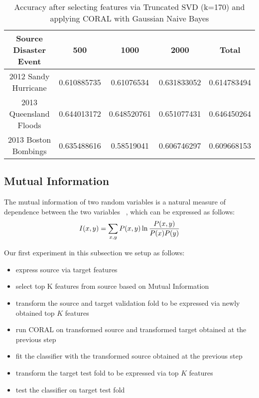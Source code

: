 \begin{table}[ht]
    \begin{center}
    \caption{Accuracy after selecting features via Truncated SVD (k=170) and applying CORAL with Gaussian Naive Bayes}
    \begin{tabular}[c]{|c|c|c|c|c|}
        \hline
        Source Disaster Event & 500 & 1000 & 2000 & Total \\
        \hline
        2012 Sandy Hurricane & 0.610885735 & 0.61076534 & 0.631833052 & 0.614783494 \\
        2013 Queensland Floods & 0.644013172 & 0.648520761 & 0.651077431 & 0.646450264 \\
        2013 Boston Bombings & 0.635488616 & 0.58519041 & 0.606746297 & 0.609668153 \\
        \hline
    \end{tabular}
    \label{tabletrunsvd170}
   \end{center}
\end{table}


\subsection{Mutual Information}

The mutual information of two random variables is a natural measure of dependence between the two variables ~\citep{hastie}, which can be expressed as follows: \[I(x,y) = \sum_{x,y} P(x,y) \ln {{P(x,y)}\over{P(x) P(y)}} \]

Our first experiment in this subsection we setup as follows:
  \begin{itemize}
  \item express source via target features
  \item select top K features from source based on Mutual Information
  \item transform the source and target validation fold to be expressed via newly obtained top $K$ features 
  \item run CORAL on transformed source and transformed target obtained at the previous step
  \item fit the classifier with the transformed source obtained at the previous step
  \item transform the target test fold to be expressed via top $K$ features
  \item test the classifier on target test fold
  \end{itemize}

